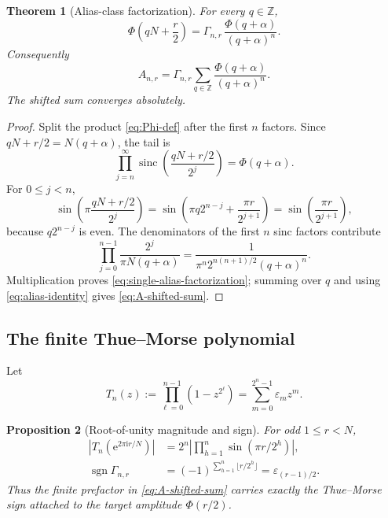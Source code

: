 \documentclass[11pt,oneside]{article}
\newtheorem{theorem}{Theorem}[section]
\newtheorem{proposition}[theorem]{Proposition}
\theoremstyle{definition}
\theoremstyle{remark}
\newcommand{\Z}{\mathbb Z}
\newcommand{\sinc}{\operatorname{sinc}}
\newcommand{\e}{\mathrm e}
\newcommand{\ii}{\mathrm i}
\newcommand{\eps}{\varepsilon}
\newcommand{\PhiU}{\Phi}
\begin{document}
\begin{theorem}[Alias-class factorization]\label{thm:alias-factorization}
For every $q\in\Z$,
\begin{equation}\label{eq:single-alias-factorization}
 \PhiU\!\left(qN+\frac r2\right)
 =\Gamma_{n,r}\,
 \frac{\PhiU(q+\alpha)}{(q+\alpha)^n}.
\end{equation}
Consequently
\begin{equation}\label{eq:A-shifted-sum}
 \boxed{
 A_{n,r}=\Gamma_{n,r}
 \sum_{q\in\Z}\frac{\PhiU(q+\alpha)}{(q+\alpha)^n}.}
\end{equation}
The shifted sum converges absolutely.
\end{theorem}

\begin{proof}
Split the product \eqref{eq:Phi-def} after the first $n$ factors.  Since
$qN+r/2=N(q+\alpha)$, the tail is
\[
 \prod_{j=n}^{\infty}
 \sinc\!\left(\frac{qN+r/2}{2^j}\right)
 =\PhiU(q+\alpha).
\]
For $0\le j<n$,
\[
 \sin\!\left(\pi\frac{qN+r/2}{2^j}\right)
 =\sin\!\left(\pi q2^{n-j}+\frac{\pi r}{2^{j+1}}\right)
 =\sin\!\left(\frac{\pi r}{2^{j+1}}\right),
\]
because $q2^{n-j}$ is even.  The denominators of the first $n$ sinc factors
contribute
\[
 \prod_{j=0}^{n-1}\frac{2^j}{\pi N(q+\alpha)}
 =\frac{1}{\pi^n2^{n(n+1)/2}(q+\alpha)^n}.
\]
Multiplication proves \eqref{eq:single-alias-factorization}; summing over $q$
and using \eqref{eq:alias-identity} gives \eqref{eq:A-shifted-sum}.
\end{proof}

\subsection{The finite Thue--Morse polynomial}

Let
\begin{equation}\label{eq:T-n-polynomial}
 T_n(z):=\prod_{\ell=0}^{n-1}(1-z^{2^\ell})
 =\sum_{m=0}^{2^n-1}\eps_mz^m.
\end{equation}

\begin{proposition}[Root-of-unity magnitude and sign]\label{prop:TM-sign-carrier}
For odd $1\le r<N$,
\begin{align}
 \left|T_n\!\left(\e^{2\pi\ii r/N}\right)\right|
 &=2^n\left|\prod_{h=1}^{n}\sin(\pi r/2^h)\right|,
 \label{eq:T-root-magnitude}\\
 \operatorname{sgn}\Gamma_{n,r}
 &=(-1)^{\sum_{h=1}^{n}\lfloor r/2^h\rfloor}
 =\eps_{(r-1)/2}.
 \label{eq:Gamma-sign}
\end{align}
Thus the finite prefactor in \eqref{eq:A-shifted-sum} carries exactly the
Thue--Morse sign attached to the target amplitude $\PhiU(r/2)$.
\end{proposition}
\end{document}
